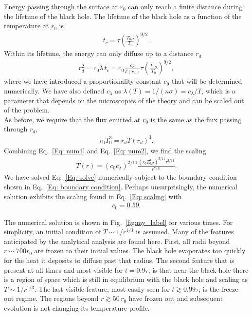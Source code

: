 \documentclass[superscriptaddress,groupedaddress,nofootnoteinbib,11pt]{article}
\newcommand\eea{\end{eqnarray}}
\newcommand\bea{\begin{eqnarray}}
\def\l{\left(}
\def\r{\right)}
\begin{document}
Energy passing through the surface at $r_0$ can only reach a finite distance during the lifetime of the black hole.  The lifetime of the black hole as a function of the temperature at $r_0$ is  
\bea
t_c = \tau \l\frac{T_{0H}}{T_0}\r^{9/2} .
\eea
Within its lifetime, the energy can only diffuse up to a distance $r_d$
\bea
\label{Eq: num1}
r_d^2=c_0 \lambda \, t_c = c_0 \frac{c_\lambda}{T(r_d)}\tau \l\frac{T_{0H}}{T_0}\r^{9/2},
\eea
where we have introduced a proportionality constant $c_0$ that will be determined numerically.  We have also defined $c_\lambda$ as $\lambda(T)=1/(n\sigma)=c_\lambda/T$, which is a parameter that depends on the microscopics of the theory and can be scaled out of the problem. \\
As before, we require that the flux emitted at $r_0$ is the same as the flux passing through $r_d$,
\bea
\label{Eq: num2}
r_0 T_0^3 = r_d T(r_d)^3.
\eea
Combining Eq.~\ref{Eq: num1} and Eq.~\ref{Eq: num2}, we find the scaling
\bea
\label{Eq: scaling}
T(r)=\left(c_0 c_\lambda \right)^{2/11}  \frac{\l r_0 T_{0H}^3\r^{3/11}\tau^{2/11}}{r^{7/11}} . 
\eea
We have solved Eq.~\ref{Eq: solve} numerically subject to the boundary condition shown in Eq.~\ref{Eq: boundary condition}.  Perhaps unsurprisingly, the numerical solution exhibits the scaling found in Eq.~\ref{Eq: scaling} with 
\bea
c_0=0.59.
\eea


The numerical solution is shown in Fig.~\ref{fig:my_label} for various times.  For simplicity, an initial condition of $T \sim 1/r^{1/3}$ is assumed.  Many of the features anticipated by the analytical analysis are found here.  First, all radii beyond $r \sim 700 r_0$ are frozen to their initial values.  The black hole evaporates too quickly for the heat it deposits to diffuse past that radius.  The second feature that is present at all times and most visible for $t = 0.9 \tau$, is that near the black hole there is a region of space which is still in equilibrium with the black hole and scaling as $T \sim 1/r^{1/3}$.  The last visible feature, most easily seen for $t \gtrsim 0.99 \tau$,  is the freeze-out regime.  The regions beyond $r \gtrsim 50 \, r_0$ have frozen out and subsequent evolution is not changing its temperature profile.
\end{document}

